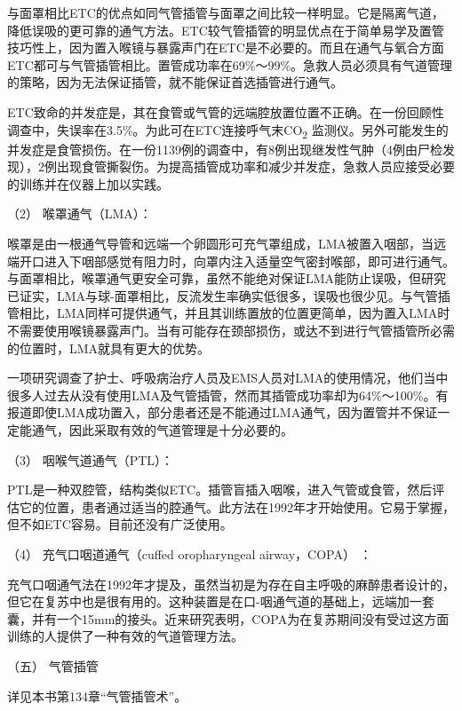 与面罩相比ETC的优点如同气管插管与面罩之间比较一样明显。它是隔离气道，降低误吸的更可靠的通气方法。ETC较气管插管的明显优点在于简单易学及置管技巧性上，因为置入喉镜与暴露声门在ETC是不必要的。而且在通气与氧合方面ETC都可与气管插管相比。置管成功率在69\%～99\%。急救人员必须具有气道管理的策略，因为无法保证插管，就不能保证首选插管进行通气。

ETC致命的并发症是，其在食管或气管的远端腔放置位置不正确。在一份回顾性调查中，失误率在3.5\%。为此可在ETC连接呼气末CO\textsubscript{2}
监测仪。另外可能发生的并发症是食管损伤。在一份1139例的调查中，有8例出现继发性气肿（4例由尸检发现），2例出现食管撕裂伤。为提高插管成功率和减少并发症，急救人员应接受必要的训练并在仪器上加以实践。

\hypertarget{text00284.htmlux5cux23CHP10-1-5-3-4-3-2}{}
（2） 喉罩通气（LMA）：

喉罩是由一根通气导管和远端一个卵圆形可充气罩组成，LMA被置入咽部，当远端开口进入下咽部感觉有阻力时，向罩内注入适量空气密封喉部，即可进行通气。与面罩相比，喉罩通气更安全可靠，虽然不能绝对保证LMA能防止误吸，但研究已证实，LMA与球-面罩相比，反流发生率确实低很多，误吸也很少见。与气管插管相比，LMA同样可提供通气，并且其训练置放的位置更简单，因为置入LMA时不需要使用喉镜暴露声门。当有可能存在颈部损伤，或达不到进行气管插管所必需的位置时，LMA就具有更大的优势。

一项研究调查了护士、呼吸病治疗人员及EMS人员对LMA的使用情况，他们当中很多人过去从没有使用LMA及气管插管，然而其插管成功率却为64\%～100\%。有报道即使LMA成功置入，部分患者还是不能通过LMA通气，因为置管并不保证一定能通气，因此采取有效的气道管理是十分必要的。

\hypertarget{text00284.htmlux5cux23CHP10-1-5-3-4-3-3}{}
（3） 咽喉气道通气（PTL）：

PTL是一种双腔管，结构类似ETC。插管盲插入咽喉，进入气管或食管，然后评估它的位置，患者通过适当的腔通气。此方法在1992年才开始使用。它易于掌握，但不如ETC容易。目前还没有广泛使用。

\hypertarget{text00284.htmlux5cux23CHP10-1-5-3-4-3-4}{}
（4） 充气口咽道通气（cuffed oropharyngeal airway，COPA） ：

充气口咽通气法在1992年才提及，虽然当初是为存在自主呼吸的麻醉患者设计的，但它在复苏中也是很有用的。这种装置是在口-咽通气道的基础上，远端加一套囊，并有一个15mm的接头。近来研究表明，COPA为在复苏期间没有受过这方面训练的人提供了一种有效的气道管理方法。

\hypertarget{text00284.htmlux5cux23CHP10-1-5-3-5}{}
（五） 气管插管

详见本书第134章“气管插管术”。

